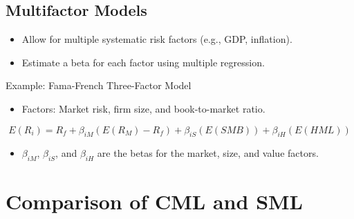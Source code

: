 \documentclass[
]{book}
\providecommand{\tightlist}{%
  \setlength{\itemsep}{0pt}\setlength{\parskip}{0pt}}
\begin{document}
\hypertarget{multifactor-models}{%
\subsection{Multifactor Models}\label{multifactor-models}}

\begin{itemize}
\tightlist
\item
  Allow for multiple systematic risk factors (e.g., GDP, inflation).
\item
  Estimate a beta for each factor using multiple regression.
\end{itemize}

Example: Fama-French Three-Factor Model

\begin{itemize}
\tightlist
\item
  Factors: Market risk, firm size, and book-to-market ratio.
\end{itemize}

\[
E(R_i) = R_f + \beta_{iM} (E(R_M) - R_f) + \beta_{iS} (E(SMB)) + \beta_{iH} (E(HML))
\]

\begin{itemize}
\tightlist
\item
  \(\beta_{iM}\), \(\beta_{iS}\), and \(\beta_{iH}\) are the betas for
  the market, size, and value factors.
\end{itemize}

\hypertarget{comparison-of-cml-and-sml}{%
\section{Comparison of CML and SML}\label{comparison-of-cml-and-sml}}
\end{document}
